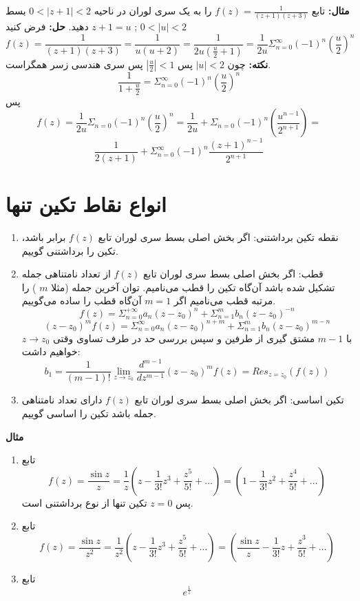 \documentclass[12pt]{report}
\begin{document}
\textbf{مثال:}
تابع
$f(z) = \frac{1}{(z+ 1)(z+ 3)}$
را به یک سری لوران در ناحیه 
$0< |z+ 1|< 2$
بسط دهید.
\textbf{حل:}
فرض کنید
$z + 1 = u$
;
$0<|u|<2$
$$f(z) = \frac{1}{(z+ 1)(z+3)} = \frac{1}{u(u + 2)} = \frac{1}{2u(\frac{u}{2} + 1)} = \frac{1}{2u} \Sigma_{n = 0}^{\infty} (-1)^n(\frac{u}{2})^n$$
\textbf{نکته:}
چون
$|u|< 2$
پس
$|\frac{u}{2}|< 1$
پس سری هندسی زسر همگراست.
$$\frac{1}{1 + \frac{u}{2}} = \Sigma_{n = 0}^{\infty} (-1)^n(\frac{u}{2})^n$$
پس
$$f(z) = \frac{1}{2u}\Sigma_{n = 0}(-1)^n(\frac{u}{2})^n = \frac{1}{2u} + \Sigma_{n = 0}(-1)^n(\frac{u^{n - 1}}{2^{n+1}}) = $$
$$\frac{1}{2(z+ 1)} + \Sigma_{n = 0}^{\infty} (-1)^n \frac{(z+ 1)^{n - 1}}{2^{n + 1}}$$

\section{انواع نقاط تکین تنها}
\begin{enumerate}
	\item
	نقطه تکین برداشتنی: اگر بخش اصلی بسط سری لوران تابع
	$f(z)$
	برابر باشد، تکین را برداشتنی گوییم.
	\item
	قطب: اگر بخش اصلی بسط سری لوران تابع
	$f(z)$
	از تعداد نامتناهی جمله تشکیل شده باشد آن‌گاه تکین را قطب می‌نامیم. توان آخرین جمله 
	(مثلا
	$m$
	)
	را مرتبه قطب می‌نامیم اگر 
	$m = 1$
	آن‌گاه قطب را ساده می‌گوییم.
	$$f(z) = \Sigma_{n = 0}^{+\infty} a_n(z - z_0)^n + \Sigma_{n = 1}^{m} b_n (z - z_0)^{-n}$$
	$$(z - z_0)^m f(z) = \Sigma_{n = 0}^{\infty} a_n(z - z_0)^{n+ m} + \Sigma_{n = 1}^{m} b_n (z - z_0)^{m-n}$$
	با 
	$m - 1$
	مشتق گیری از طرفین و سپس بررسی حد در طرف تساوی وقتی
	$z \to z_0$
	خواهیم داشت:
	$$b_1 = \frac{1}{(m - 1)!} \lim_{z \to z_0} \frac{d^{m - 1}}{d z^{m - 1}}(z - z_0)^m f(z) = Res_{z = z_0}(f(z))$$
	
	\item
	تکین اساسی: اگر بخش اصلی بسط سری لوران تابع
	$f(z)$
	دارای  تعداد نامتناهی جمله باشد تکین را اساسی گوییم.
	
	
\end{enumerate}
\newline

\textbf{مثال}
\begin{enumerate}
	\item 
	تابع
	$$f(z) = \frac{\sin z}{z} = \frac{1}{z}(z - \frac{1}{3!} z^3 + \frac{z^5}{5!} + \dots) = (1 -\frac{1}{3!} z^2 + \frac{z^4}{5!} + \dots)$$
	پس 
	$z = 0$
	تکین تنها از نوع برداشتنی است.
	\item
	تابع
	$$f(z) = \frac{\sin z}{z^2} = \frac{1}{z^2}(z - \frac{1}{3!} z^3 + \frac{z^5}{5!} + \dots) = (\frac{\sin z}{z} -\frac{1}{3!} z + \frac{z^3}{5!} + \dots)$$
	\item
	تابع
	$$e^{\frac{1}{z}}$$
	
	
\end{enumerate}
\end{document}
